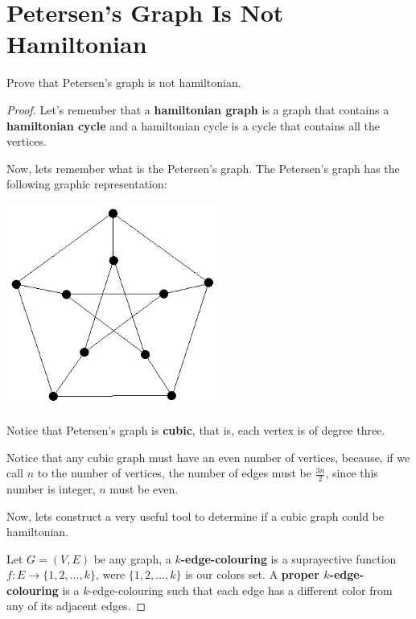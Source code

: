 ﻿\chapter{Petersen's Graph Is Not Hamiltonian}

    \begin{problem}
        Prove that Petersen's graph is not hamiltonian.
    \end{problem}
    
    \begin{proof}
        Let's remember that a \textbf{hamiltonian graph} is a graph that contains a \textbf{hamiltonian cycle} and a hamiltonian cycle is
        a cycle that contains all the vertices.\pn
        
        Now, lets remember what is the Petersen's graph. The Petersen's graph has the following graphic representation:
        \begin{center}
            \includegraphics[width=7cm]{PetersenIsNotHamiltonian/Petersen1.png}    
        \end{center}\pn
        
        Notice that Petersen's graph is \textbf{cubic}, that is, each vertex is of degree three.\pn 

        Notice that any cubic graph must have an even number of vertices, because, if we call $n$ to the number of vertices, 
        the number of edges must be $\frac{3n}{2}$, since this number is integer, $n$ must be even.\pn
        
        Now, lets construct a very useful tool to determine if a cubic graph could be hamiltonian.\pn 
        
        Let $G = (V, E)$ be any graph, a \textbf{$k$-edge-colouring} is a suprayective function $f : E \longrightarrow \{1, 2, \dots, k\}$, 
        were $\{1, 2, \dots, k\}$ is our colors set. A \textbf{proper $k$-edge-colouring} is a $k$-edge-colouring such that each edge has a 
        different color from any of its adjacent edges.\pn
               

\end{proof}

